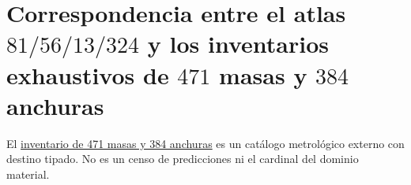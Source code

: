 \section{Correspondencia entre el atlas \(81/56/13/324\) y los inventarios exhaustivos de \(471\) masas y \(384\) anchuras}
\label{chap:portal-atlas-inventarios-masas}
El \hyperref[chap:inventario-universal-471-masas-384-anchuras]{inventario de
471 masas y 384 anchuras} es un catálogo metrológico externo con destino
tipado. No es un censo de predicciones ni el cardinal del dominio material.
